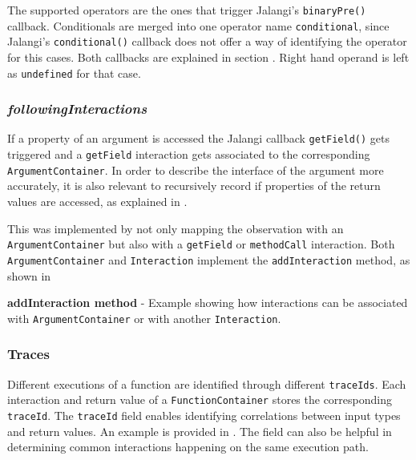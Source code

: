 The supported operators are the ones that trigger Jalangi's \texttt{binaryPre()} callback. Conditionals are merged into one operator name \texttt{conditional}, since Jalangi's \texttt{conditional()} callback does not offer a way of identifying the operator for this cases. Both callbacks are explained in section . Right hand operand is left as \texttt{undefined} for that case.



\subsubsection{\textit{followingInteractions}}
If a property of an argument is accessed the Jalangi callback \texttt{getField()} gets triggered and a \texttt{getField} interaction gets associated to the corresponding \texttt{ArgumentContainer}. In order to describe the interface of the argument more accurately, it is also relevant to recursively record if properties of the return values are accessed, as explained in .

This was implemented by not only mapping the observation with an \texttt{ArgumentContainer} but also with a \texttt{getField} or \texttt{methodCall} interaction. Both \texttt{ArgumentContainer} and \texttt{Interaction} implement the \texttt{addInteraction} method, as shown in 

\begin{code}
  \caption[addInteraction method]{\textbf{addInteraction method} - Example showing how interactions can be associated with \texttt{ArgumentContainer} or with another \texttt{Interaction}.}
  \label{code:add-interaction-example}
\end{code}



\subsubsection{Traces}
Different executions of a function are identified through different \texttt{traceIds}. Each interaction and return value of a \texttt{FunctionContainer} stores the corresponding \texttt{traceId}. The \texttt{traceId} field enables identifying correlations between input types and return values. An example is provided in . The field can also be helpful in determining common interactions happening on the same execution path.

